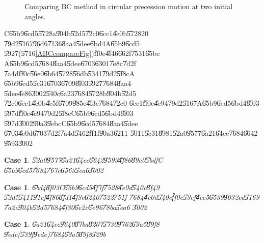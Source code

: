 \documentclass[12pt,a4paper]{article}
\newtheorem{case}[theorem]{Case}
\begin{document}
\begin{figure}[th]
\caption{Comparing BC method in circular precession motion at two initial
angles.}
\label{BC_d_5590}
\begin{center}

\end{center}
\end{figure}

C\U{65b9}\U{6cd5}\U{5728}a\U{904b}\U{52d5}\U{72c0}\U{6cc1}\U{4e0b}\U{5728}20%
\U{79d2}\U{5167}\U{96d6}\U{7136}\U{8aa4}\U{5dee}\U{6bd4}A\U{65b9}\U{6cd5}%
\U{5927}(\U{5716}\ref{ABCcompareFig})\U{ff0c}\U{4f46}\U{662f}\U{7531}\U{65bc}%
A\U{65b9}\U{6cd5}\U{7684}\U{8aa4}\U{5dee}\U{6703}\U{6301}\U{7e8c}\U{7d2f}%
\U{7a4d}\U{ff0c}\U{56e0}\U{6b64}\U{5728}\U{56db}\U{5341}\U{79d2}\U{5f8c}A%
\U{65b9}\U{6cd5}\U{5c31}\U{6703}\U{6709}\U{8f03}\U{5927}\U{7684}\U{8aa4}%
\U{5dee}\U{4e86}\U{3002}\U{540c}\U{6a23}\U{7684}\U{5728}b\U{904b}\U{52d5}%
\U{72c0}\U{6cc1}\U{4e0b}\U{4e5f}\U{6709}\U{985e}\U{4f3c}\U{7684}\U{72c0}%
\U{6cc1}\U{ff0c}\U{4e94}\U{79d2}\U{5167}A\U{65b9}\U{6cd5}\U{6bd4}\U{8f03}%
\U{597d}\U{ff0c}\U{4e94}\U{79d2}\U{5f8c}C\U{65b9}\U{6cd5}\U{6bd4}\U{8f03}%
\U{597d}\U{3002}\U{90a3}\U{9ebc}C\U{65b9}\U{6cd5}\U{7684}\U{8aa4}\U{5dee}%
\U{6703}\U{4e0d}\U{6703}\U{7d2f}\U{7a4d}\U{5462}\U{ff1f}\U{90a3}\U{6211}%
\U{5011}\U{5c31}\U{8981}\U{52a0}\U{9577}\U{6a21}\U{64ec}\U{7684}\U{6642}%
\U{9593}\U{3002}

\begin{case}
\U{52a0}\U{9577}\U{6a21}\U{64ec}\U{6642}\U{9593}\U{4f86}\U{89c0}\U{5bdf}C%
\U{65b9}\U{6cd5}\U{7684}\U{767c}\U{6563}\U{5ea6}\U{3002}
\end{case}

\begin{case}
\U{6bd4}\U{8f03}C\U{65b9}\U{6cd5}\U{4f7f}\U{7528}\U{4e0d}\U{540c}\U{8f49}%
\U{52d5}\U{5411}\U{91cf}\U{4f86}\U{8fd1}\U{4f3c}\U{6240}\U{7522}\U{751f}%
\U{7684}\U{4e0d}\U{540c}\U{ff0c}\U{53ef}\U{4ee5}\U{6539}\U{9032}cd\U{5169}%
\U{7a2e}\U{904b}\U{52d5}\U{7684}\U{4f30}\U{6e2c}\U{6e96}\U{78ba}\U{5ea6}%
\U{3002}
\end{case}

\begin{case}
\U{6a21}\U{64ec}\U{9640}\U{87ba}\U{8207}\U{5730}\U{9762}\U{63a5}\U{89f8}%
\U{9ede}(\U{539f}\U{9ede})\U{7684}\U{63a5}\U{89f8}\U{529b}
\end{case}
\end{document}
